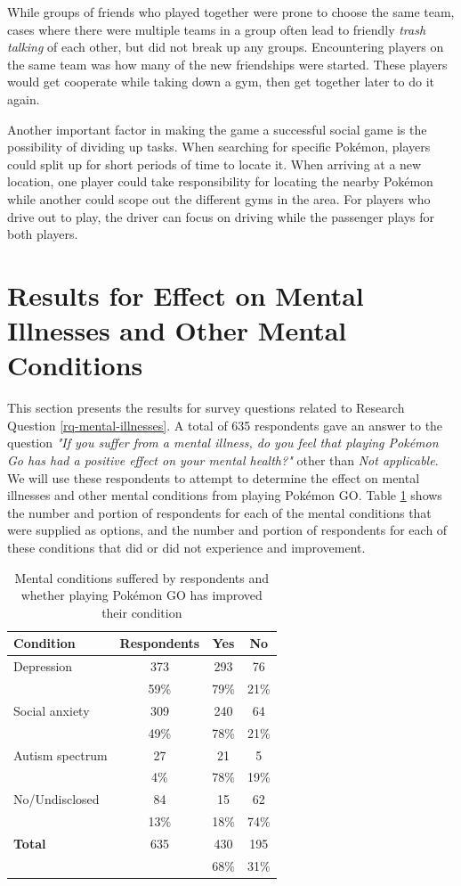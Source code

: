 While groups of friends who played together were prone to choose the same team, cases where there were multiple teams in a group often lead to friendly \emph{trash talking} of each other, but did not break up any groups. Encountering players on the same team was how many of the new friendships were started. These players would get cooperate while taking down a gym, then get together later to do it again.

Another important factor in making the game a successful social game is the possibility of dividing up tasks. When searching for specific Pokémon, players could split up for short periods of time to locate it. When arriving at a new location, one player could take responsibility for locating the nearby Pokémon while another could scope out the different gyms in the area. For players who drive out to play, the driver can focus on driving while the passenger plays for both players.

\section{Results for Effect on Mental Illnesses and Other Mental Conditions}

This section presents the results for survey questions related to Research Question \ref{rq-mental-illnesses}. A total of 635 respondents gave an answer to the question \emph{"If you suffer from a mental illness, do you feel that playing Pokémon Go has had a positive effect on your mental health?"} other than \emph{Not applicable}. We will use these respondents to attempt to determine the effect on mental illnesses and other mental conditions from playing Pokémon GO. Table \ref{tbl:mental-conditions-effect} shows the number and portion of respondents for each of the mental conditions that were supplied as options, and the number and portion of respondents for each of these conditions that did or did not experience and improvement.

\begin{table}[h]
	\centering
	\caption{Mental conditions suffered by respondents and whether playing Pokémon GO has improved their condition}
	\label{tbl:mental-conditions-effect}
	\begin{tabular}{|l|c|c|c|}
		\hline
		\textbf{Condition} & \textbf{Respondents} & \textbf{Yes} & \textbf{No}\\
		\hline\hline
		Depression		& 373	& 293	& 76\\
						& 59\%	& 79\%	& 21\%\\\hline
		Social anxiety	& 309	& 240	& 64\\
						& 49\%	& 78\%	& 21\%\\\hline
		Autism spectrum	& 27	& 21	& 5\\
						& 4\%	& 78\%	& 19\%\\\hline
		No/Undisclosed	& 84	& 15	& 62\\
						& 13\%	& 18\%	& 74\%\\\hline
		\hline\hline
		\textbf{Total}	& 635	& 430	& 195\\
						& 		& 68\%	& 31\%\\\hline
	\end{tabular}
\end{table}

